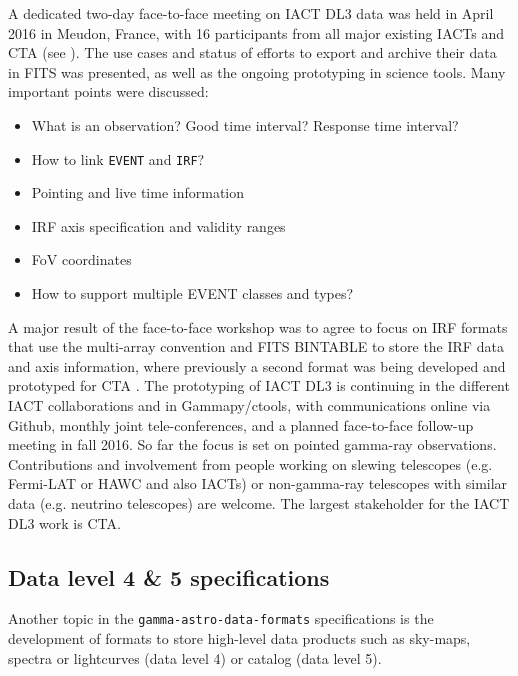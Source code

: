 A dedicated two-day face-to-face meeting on IACT DL3 data was held in April 2016 in Meudon, France, with 16 participants from all major existing IACTs and CTA (see \ogrameudon). The use cases and status of efforts to export and archive their data in FITS was presented, as well as the ongoing prototyping in science tools. Many important points were discussed:

\begin{itemize}
\item{}What is an observation? Good time interval? Response time interval?
\item{}How to link \texttt{EVENT} and \texttt{IRF}?
\item{}Pointing and live time information
\item{}IRF axis specification and validity ranges
\item{}FoV coordinates
\item{}How to support multiple EVENT classes and types?
\end{itemize}

A major result of the face-to-face workshop was to agree to focus on IRF formats that use the multi-array convention and FITS BINTABLE to store the IRF data and axis information, where previously a second format was being developed and prototyped for CTA \citep{2015arXiv150807437W}. The prototyping of IACT DL3 is continuing in the different IACT collaborations and in Gammapy/ctools, with communications online via Github, monthly joint tele-conferences, and a planned face-to-face follow-up meeting in fall 2016. So far the focus is set on pointed gamma-ray observations. Contributions and involvement from people working on slewing telescopes (e.g. Fermi-LAT or HAWC and also IACTs) or non-gamma-ray telescopes with similar data (e.g. neutrino telescopes) are welcome. The largest stakeholder for the IACT DL3 work is CTA.

\subsection{Data level 4 \& 5 specifications}

Another topic in the \texttt{gamma-astro-data-formats} specifications is the development of formats to store high-level data products such as sky-maps, spectra or lightcurves (data level 4) or catalog (data level 5).

